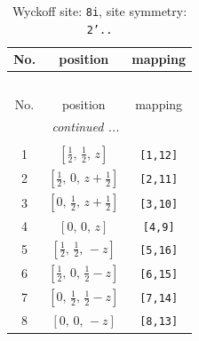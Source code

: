 \documentclass[fleqn,8pt]{jsarticle}
\begin{document}
\begin{longtable}{ccc}
\caption{Wyckoff site: {\tt 8i}, site symmetry: {\tt 2'..}}
 \\
 \hline \hline
No. & position & mapping \\ \hline \endfirsthead

\multicolumn{2}{l}{\tablename\ \thetable{}} \\
 \hline \hline
No. & position & mapping \\ \hline \endhead

 \hline \hline
\multicolumn{2}{r}{\footnotesize\it continued ...} \\ \endfoot

 \hline \hline
\multicolumn{2}{r}{} \\ \endlastfoot

1 & $\left[ \frac{1}{2},\, \frac{1}{2},\, z \right]$ & {\tt [1,12]} \\ \hline
2 & $\left[ \frac{1}{2},\, 0,\, z + \frac{1}{2} \right]$ & {\tt [2,11]} \\ \hline
3 & $\left[ 0,\, \frac{1}{2},\, z + \frac{1}{2} \right]$ & {\tt [3,10]} \\ \hline
4 & $\left[ 0,\, 0,\, z \right]$ & {\tt [4,9]} \\ \hline
5 & $\left[ \frac{1}{2},\, \frac{1}{2},\, - z \right]$ & {\tt [5,16]} \\ \hline
6 & $\left[ \frac{1}{2},\, 0,\, \frac{1}{2} - z \right]$ & {\tt [6,15]} \\ \hline
7 & $\left[ 0,\, \frac{1}{2},\, \frac{1}{2} - z \right]$ & {\tt [7,14]} \\ \hline
8 & $\left[ 0,\, 0,\, - z \right]$ & {\tt [8,13]} \\
\end{longtable}
\renewcommand{\arraystretch}{1.2}
\end{document}
